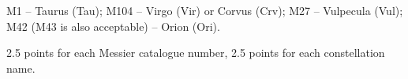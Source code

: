 M1 -- Taurus (Tau); M104 -- Virgo (Vir) or Corvus (Crv); M27 -- Vulpecula
(Vul); M42 (M43 is also acceptable) -- Orion (Ori).

2.5 points for each Messier catalogue number, 2.5 points for each
constellation name.
